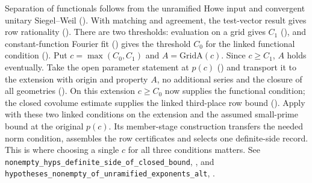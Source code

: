 \begin{outline}
Separation of functionals follows from the unramified Howe input and
convergent unitary Siegel--Weil (). With matching and
agreement, the test-vector result gives row rationality ().
There are two thresholds: evaluation on a grid gives $C_1$
(), and constant-function Fourier fit ()
gives the threshold $C_0$ for the linked functional condition
(). Put $c=\max(C_0,C_1)$ and
$A=\mathrm{GridA}(c)$. Since $c\ge C_1$, $A$ holds eventually.
Take the open parameter statement at $p(c)$ () and
transport it to the extension with origin and property $A$, no
additional series and the closure of all geometries ().
On this extension $c\ge C_0$ now supplies the functional condition;
the closed covolume estimate supplies the linked third-place row bound
(). Apply  with these two linked conditions
on the extension and the assumed small-prime bound at the original
$p(c)$. Its member-stage construction transfers the needed norm
condition, assembles the row certificates and selects one definite-side
record. This is where choosing a single $c$ for all three conditions
matters. See \nolinkurl{nonempty_hyps_definite_side_of_closed_bound},
, and
\nolinkurl{hypotheses_nonempty_of_unramified_exponents_alt},
.
\end{outline}
